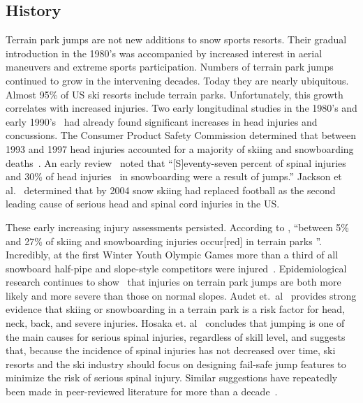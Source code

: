 \documentclass[smallextended]{svjour3}       %
\begin{document}
\subsection{History}
\label{sec:hist}
%
Terrain park jumps are not new additions to snow sports resorts. Their gradual
introduction in the 1980's was accompanied by increased interest in aerial maneuvers
and extreme sports participation. Numbers of terrain park jumps continued to grow in the intervening decades. Today they are nearly ubiquitous. Almost 95\% of US ski resorts include terrain parks. Unfortunately, this
growth correlates with increased injuries. Two early longitudinal studies in
the 1980's and early 1990's~\cite{Deibert1998,Furrer1995} had already found
significant increases in head injuries and concussions. The Consumer Product
Safety Commission determined that between 1993 and 1997 head injuries accounted
for a majority of skiing and snowboarding deaths~\cite{CPSC1999}. An early
review~\cite{Koehle2002} noted that ``[S]eventy-seven percent of spinal
injuries~\cite{Tarazi1999} and 30\% of head injuries~\cite{Fukuda2001} in
snowboarding were a result of jumps.'' Jackson et al.~\cite{Jackson2004}
determined that by 2004 snow skiing had replaced football as the second leading
cause of serious head and spinal cord injuries in the US.

These early increasing injury assessments persisted. According to
\cite{Russell2014}, ``between 5\% and 27\% of skiing and snowboarding injuries
occur[red] in terrain parks
\cite{Bridges2003,Goulet2007,Moffat2009,Greve2009,Brooks2010,Ruedl2013}''.
Incredibly, at the first Winter Youth Olympic Games more than a third of all
snowboard half-pipe and slope-style competitors were
injured~\cite{Ruedl2012}. Epidemiological research continues to
show~\cite{Carus2016,Audet2019a,Hosaka2020} that injuries on terrain park jumps are
both more likely and more severe than those on normal slopes.
Audet et.~al~\cite{Audet2019a} provides strong evidence that skiing or
snowboarding in a terrain park is a risk factor for head, neck, back, and
severe injuries. Hosaka et. al~\cite{Hosaka2020} concludes that jumping is one
of the main causes for serious spinal injuries, regardless of skill level, and
suggests that, because the incidence of spinal injuries has not decreased over
time, ski resorts and the ski industry should focus on designing fail-safe jump
features to minimize the risk of serious spinal injury. Similar suggestions
have repeatedly been made in peer-reviewed literature for more than a
decade~\cite{Hubbard2009,Swedberg2012,McNeil2012,McNeil2012a,Hubbard2015,Levy2015,Petrone2017,Moore2018}.
\end{document}
